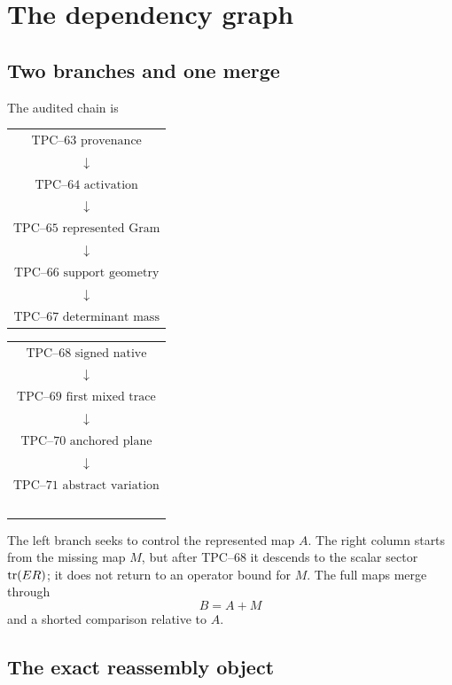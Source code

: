 \section{The dependency graph}
\label{sec:dependency-graph}

\subsection{Two branches and one merge}

The audited chain is
\begin{center}
\begin{tabular}{c}
\(\boxed{\text{TPC--63 provenance}}\)\\[-1mm]
\(\downarrow\)\\[-1mm]
\(\boxed{\text{TPC--64 activation}}\)\\[-1mm]
\(\downarrow\)\\[-1mm]
\(\boxed{\text{TPC--65 represented Gram}}\)\\[-1mm]
\(\downarrow\)\\[-1mm]
\(\boxed{\text{TPC--66 support geometry}}\)\\[-1mm]
\(\downarrow\)\\[-1mm]
\(\boxed{\text{TPC--67 determinant mass}}\)
\end{tabular}
\qquad
\begin{tabular}{c}
\(\boxed{\text{TPC--68 signed native}}\)\\[-1mm]
\(\downarrow\)\\[-1mm]
\(\boxed{\text{TPC--69 first mixed trace}}\)\\[-1mm]
\(\downarrow\)\\[-1mm]
\(\boxed{\text{TPC--70 anchored plane}}\)\\[-1mm]
\(\downarrow\)\\[-1mm]
\(\boxed{\text{TPC--71 abstract variation}}\)\\[2mm]
\(\phantom{\boxed{\text{TPC--71 abstract variation}}}\)
\end{tabular}
\end{center}
The left branch seeks to control the represented map \(A\).  The right
column starts from the missing map \(M\), but after TPC--68 it descends to
the scalar sector \(\operatorname{tr}(ER)\); it does not return to an operator bound for
\(M\).  The full maps merge through
\[
 B=A+M
\]
and a shorted comparison relative to \(A\).

\subsection{The exact reassembly object}

